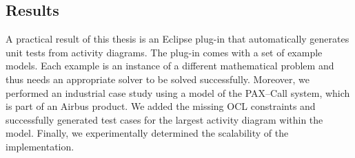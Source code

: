 \subsection{Results}
A practical result of this thesis is an Eclipse plug-in that automatically generates unit tests from activity diagrams. The plug-in comes with a set of example models. Each example is an instance of a different mathematical problem and thus needs an appropriate solver to be solved successfully. Moreover, we performed an industrial case study using a model of the PAX--Call system, which is part of an Airbus product. We added the missing OCL constraints and successfully generated test cases for the largest activity diagram within the model. Finally, we experimentally determined the scalability of the implementation.

